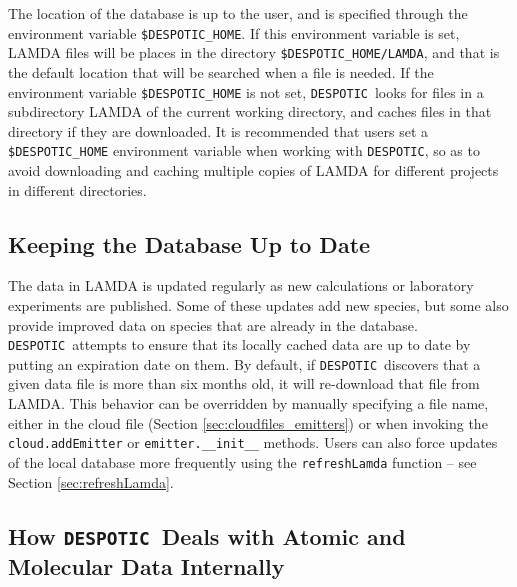 \documentclass[12pt]{article}
\newcommand{\despotic}{\texttt{DESPOTIC}}
\begin{document}
The location of the database is up to the user, and is specified through the environment variable \verb=$DESPOTIC_HOME=. If this environment variable is set, LAMDA files will be places in the directory \verb=$DESPOTIC_HOME/LAMDA=, and that is the default location that will be searched when a file is needed. If the environment variable \verb=$DESPOTIC_HOME= is not set, \despotic\ looks for files in a subdirectory LAMDA of the current working directory, and caches files in that directory if they are downloaded. It is recommended that users set a \verb=$DESPOTIC_HOME= environment variable when working with \despotic, so as to avoid downloading and caching multiple copies of LAMDA for different projects in different directories.


\subsection{Keeping the Database Up to Date}
\label{sec:database_updates}

The data in LAMDA is updated regularly as new calculations or laboratory experiments are published. Some of these updates add new species, but some also provide improved data on species that are already in the database.  \despotic\ attempts to ensure that its locally cached data are up to date by putting an expiration date on them. By default, if \despotic\ discovers that a given data file is more than six months old, it will re-download that file from LAMDA. This behavior can be overridden by manually specifying a file name, either in the cloud file (Section \ref{sec:cloudfiles_emitters}) or when invoking the \verb=cloud.addEmitter= or \verb=emitter.__init__= methods. Users can also force updates of the local database more frequently using the \verb=refreshLamda= function -- see Section \ref{sec:refreshLamda}.


\subsection{How \despotic\ Deals with Atomic and Molecular Data Internally}
\end{document}
